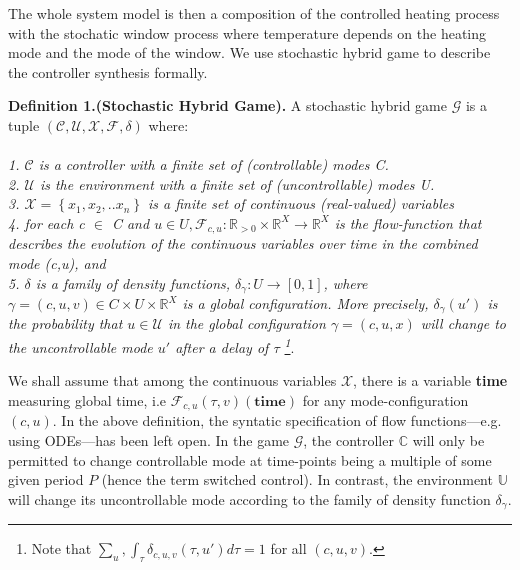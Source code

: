     The whole system model is then a composition of the controlled heating 
    process with the stochatic window process where temperature depends on 
    the heating mode and the mode of the window. We use stochastic hybrid 
    game to describe the controller synthesis formally.






    \textbf{Definition 1.(Stochastic Hybrid Game).} A stochastic hybrid game $\mathcal{G}$ is a
    tuple $(\mathcal{C,U,X,F},\delta)$ where:
    \\
    \\
    \emph{1. $\mathcal{C}$ is a controller with a finite set of (controllable) modes C.} \\
    \emph{2. $\mathcal{U}$ is the environment with a finite set of (uncontrollable) modes U.} \\
    \emph{3. $\mathcal{X} = \left\lbrace x_1,x_2,..x_n \right\rbrace$ is a finite set of
    continuous (real-valued) variables } \\
    \emph{4. for each c $\in$ C and $u \in U, \mathcal{F}_{c,u} : \mathbb{R}_{>0}
      \times \mathbb{R}^X \rightarrow\mathbb{R}^X$ 
        is the flow-function that describes the evolution of the continuous variables
        over time in the combined mode (c,u), and} \\
    \emph{5. $\delta$ is a family of density functions, $\delta_\gamma: 
    U \rightarrow 
    [0,1]$, where $ \gamma = (c,u,v) \in C \times U
    \times \mathbb{R}^X$ is a global configuration.
    More precisely, $\delta_{\gamma}(u')$ is the probability that $u \in \mathcal{U}$
    in the global configuration $ \gamma = (c,u,x)$ will change to the
      uncontrollable mode $u'$ after a delay of $\tau$ 
      \footnote{Note that $\sum_u,\int_{\tau}\delta_{c,u,v}(\tau,u')d\tau = 1$ for all $(c,u,v)$.}}.

    We shall assume that among the continuous variables $\mathcal{X}$, there is a variable
    \textbf{time} measuring global time, i.e $\mathcal{F}_{c,u}(\tau,v)(\textbf{time})$ 
    for any mode-configuration $(c,u)$. In the above definition, the syntatic specification
    of flow functions---e.g. using ODEs---has been left open. In the game $\mathcal{G}$,
    the controller $\mathbb{C}$ will only be permitted to change controllable mode at time-points
    being a multiple of some given period $P$ (hence the term switched control). In contrast,
    the environment $\mathbb{U}$ will change its uncontrollable mode according to the 
    family of density function $\delta_\gamma$.
    

